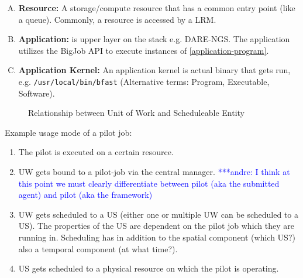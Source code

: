 \documentclass[conference,final]{IEEEtran}
\newcommand{\alnote}[1]{ {\textcolor{blue} { ***andre: #1 }}}
\newcommand{\alnote}[1]{}
\begin{document}
\begin{enumerate}[A.]

\item \textbf{Resource:} A storage/compute resource that has a common
  entry point (like a queue). Commonly, a resource is accessed by a 
  LRM.\label{resource}

\item \textbf{Application:} is upper layer on the stack
  e.g. DARE-NGS. The application utilizes the BigJob API to execute
  instances of \ref{application-program}. \label{application}

\item \textbf{Application Kernel:} An application kernel is actual
  binary that gets run, e.g. \texttt{/usr/local/bin/bfast}
  (Alternative terms: Program, Executable,
  Software). \label{application-program}
	
\end{enumerate}

\begin{figure}[htbp]
        \centering    
{}\qquad\qquad
    \caption{Relationship between Unit of Work and Scheduleable Entity}
    \label{fig:figures_task-job1}
\end{figure}    

\noindent
Example usage mode of a pilot job:
\begin{enumerate}
    \item The pilot is executed on a certain resource.
    \item UW gets bound to a pilot-job via the central manager. 
    \alnote{I think at this point we must 
    clearly differentiate between pilot (aka the submitted agent) and pilot (aka 
    the framework)}
    \item UW gets scheduled to a US  (either one or multiple UW can be 
     scheduled to a US). The properties of the US are dependent on the pilot job 
     which they are running in. Scheduling has in addition to the spatial 
     component (which US?) also a temporal component (at what time?).
    \item US gets scheduled to a physical resource on which the pilot is 
     operating.
\end{enumerate}
\end{document}
